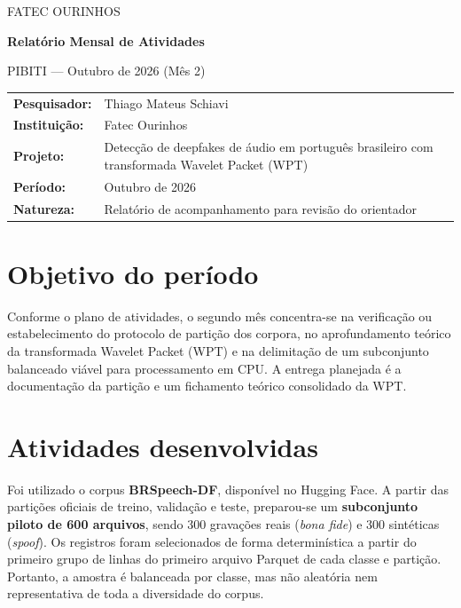 \documentclass[11pt,a4paper]{article}
\newcommand{\subtitulo}[1]{\vspace{4pt}{\large\bfseries #1}\par\vspace{2pt}}
\begin{document}
\begin{center}
{\small FATEC OURINHOS}\par
\vspace{0.4cm}
{\Large\bfseries Relatório Mensal de Atividades}\par
\vspace{0.18cm}
{\large PIBITI --- Outubro de 2026 (Mês 2)}\par
\vspace{0.6cm}
\end{center}
\begin{tabularx}{\linewidth}{@{}lX@{}}
\textbf{Pesquisador:} & Thiago Mateus Schiavi\\
\textbf{Instituição:} & Fatec Ourinhos\\
\textbf{Projeto:} & Detecção de deepfakes de áudio em português brasileiro com transformada Wavelet Packet (WPT)\\
\textbf{Período:} & Outubro de 2026\\
\textbf{Natureza:} & Relatório de acompanhamento para revisão do orientador\\
\end{tabularx}
\vspace{0.35cm}
\section{Objetivo do período}
Conforme o plano de atividades, o segundo mês concentra-se na verificação ou estabelecimento do protocolo de partição dos corpora, no aprofundamento teórico da transformada Wavelet Packet (WPT) e na delimitação de um subconjunto balanceado viável para processamento em CPU. A entrega planejada é a documentação da partição e um fichamento teórico consolidado da WPT.
\section{Atividades desenvolvidas}
\subtitulo{2.1 Inventário e preparação do corpus}
Foi utilizado o corpus \textbf{BRSpeech-DF}, disponível no Hugging Face. A partir das partições oficiais de treino, validação e teste, preparou-se um \textbf{subconjunto piloto de 600 arquivos}, sendo 300 gravações reais (\emph{bona fide}) e 300 sintéticas (\emph{spoof}). Os registros foram selecionados de forma determinística a partir do primeiro grupo de linhas do primeiro arquivo Parquet de cada classe e partição. Portanto, a amostra é balanceada por classe, mas não aleatória nem representativa de toda a diversidade do corpus.
\end{document}
